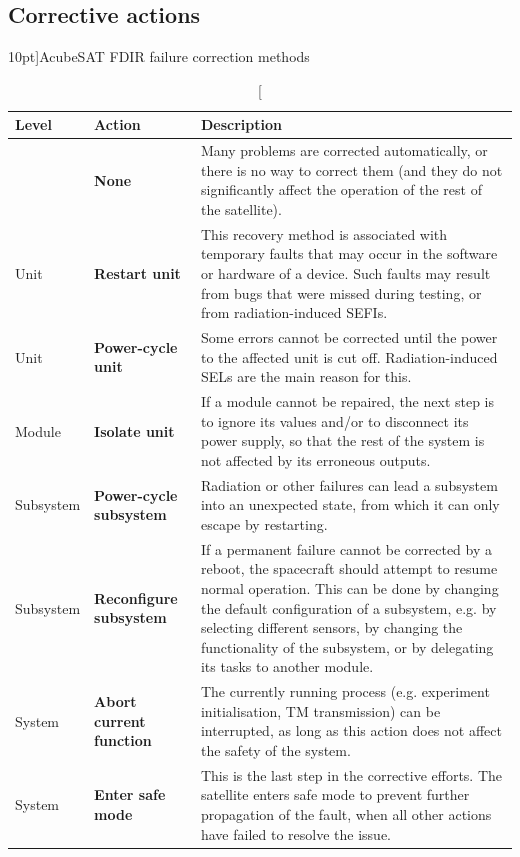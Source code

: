 \documentclass[a4paper,nobib]{tufte-book}
\begin{document}
\clearpage
\subsection{Corrective actions}

\begin{table}[h]
	\centering
	\caption[][10pt]{AcubeSAT \acs{FDIR} failure correction methods}
	\label{tab:fdir_correction}
	\renewcommand{\arraystretch}{1.5}
	\begin{tabularx}{\textwidth}{@{}lL{3cm}X@{}}
		\toprule
		Level & Action & Description \\ \midrule
		& \textbf{None} & Many problems are corrected automatically, or there is no way to correct them (and they do not significantly affect the operation of the rest of the satellite). \\
		Unit & \textbf{Restart unit} & This recovery method is associated with temporary faults that may occur in the software or hardware of a device. Such faults may result from bugs that were missed during testing, or from radiation-induced \acsp{SEFI}. \\
		Unit & \textbf{Power-cycle unit} & Some errors cannot be corrected until the power to the affected unit is cut off. Radiation-induced \acsp{SEL} are the main reason for this. \\
		Module & \textbf{Isolate unit} & If a module cannot be repaired, the next step is to ignore its values and/or to disconnect its power supply, so that the rest of the system is not affected by its erroneous outputs. \\
		Subsystem & \textbf{Power-cycle subsystem} & Radiation or other failures can lead a subsystem into an unexpected state, from which it can only escape by restarting. \\
		Subsystem & \textbf{Reconfigure subsystem} & If a permanent failure cannot be corrected by a reboot, the spacecraft should attempt to resume normal operation. This can be done by changing the default configuration of a subsystem, e.g. by selecting different sensors, by changing the functionality of the subsystem, or by delegating its tasks to another module. \\
		System & \textbf{Abort current function} & The currently running process (e.g. experiment initialisation, \acs{TM} transmission) can be interrupted, as long as this action does not affect the safety of the system. \\
		System & \textbf{Enter safe mode} & This is the last step in the corrective efforts. The satellite enters safe mode to prevent further propagation of the fault, when all other actions have failed to resolve the issue. \\ \bottomrule
	\end{tabularx}
\end{table}
\end{document}
